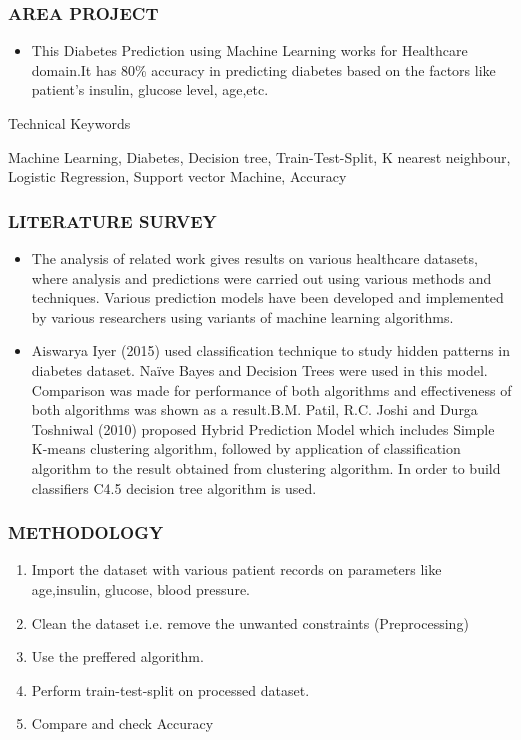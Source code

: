 \documentclass{beamer}
\begin{document}
\begin{frame}
\frametitle{\bf AREA PROJECT}
  \begin{itemize}
      \item \normalsize{This Diabetes Prediction using Machine Learning works for Healthcare domain.It has 80\% accuracy in predicting diabetes based on the factors like patient’s insulin, glucose level, age,etc.}
  \end{itemize}
\begin{block}
    {}
    Technical Keywords
  \end{block}
  \normalsize{Machine Learning, Diabetes, Decision tree, Train-Test-Split, K nearest neighbour, Logistic Regression, Support vector Machine, Accuracy
}  
  \end{frame}
  
 \begin{frame}
\frametitle{\bf LITERATURE SURVEY}
  \begin{itemize}
      
      \item \normalsize{The analysis of related work gives results on various healthcare datasets, where analysis and predictions were carried out using various methods and techniques. Various prediction models have been developed and implemented by various researchers using variants of machine learning algorithms.}
     
      \item \normalsize{Aiswarya Iyer (2015) used classification technique to study hidden patterns in diabetes dataset. Naïve Bayes and Decision Trees were used in this model. Comparison was made for performance of both algorithms and effectiveness of both algorithms was shown as a result.B.M. Patil, R.C. Joshi and Durga Toshniwal (2010) proposed Hybrid Prediction Model which includes Simple K-means clustering algorithm, followed by application of classification algorithm to the result obtained from clustering algorithm. In order to build classifiers C4.5 decision tree algorithm is used.}
  \end{itemize}
  \end{frame}

\begin{frame}
\frametitle{\bf METHODOLOGY}
  \begin{enumerate}
      \item Import the dataset with various patient records on parameters like age,insulin, glucose, blood pressure.
      \item Clean the dataset i.e. remove the unwanted constraints (Preprocessing)
      \item Use the preffered algorithm.
      \item Perform train-test-split on processed dataset.
      \item Compare and check Accuracy

  \end{enumerate}
\end{frame}
\end{document}
